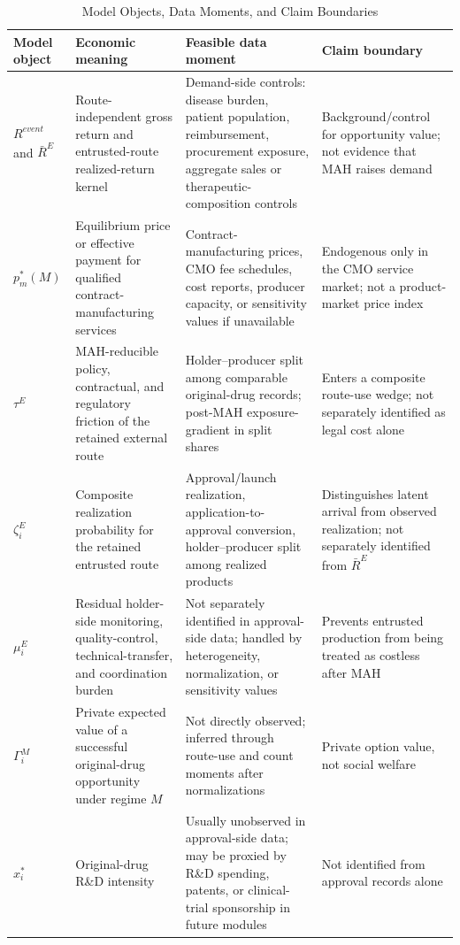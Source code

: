 \documentclass[12pt]{article}
\newcommand{\1}{\mathbf{1}}
\begin{document}
\begin{table}[htbp]
\centering
\scriptsize
\caption{Model Objects, Data Moments, and Claim Boundaries}
\label{tab:model_data_mapping}
\begin{tabularx}{\textwidth}{@{}L{0.17\textwidth}L{0.25\textwidth}L{0.24\textwidth}Y@{}}
\toprule
Model object & Economic meaning & Feasible data moment & Claim boundary \\
\midrule
$R^{event}$ and $\bar R^E$ & Route-independent gross return and entrusted-route realized-return kernel & Demand-side controls: disease burden, patient population, reimbursement, procurement exposure, aggregate sales or therapeutic-composition controls & Background/control for opportunity value; not evidence that MAH raises demand \\
$p_m^*(M)$ & Equilibrium price or effective payment for qualified contract-manufacturing services & Contract-manufacturing prices, CMO fee schedules, cost reports, producer capacity, or sensitivity values if unavailable & Endogenous only in the CMO service market; not a product-market price index \\
$\tau^E$ & MAH-reducible policy, contractual, and regulatory friction of the retained external route & Holder--producer split among comparable original-drug records; post-MAH exposure-gradient in split shares & Enters a composite route-use wedge; not separately identified as legal cost alone \\
$\zeta_i^E$ & Composite realization probability for the retained entrusted route & Approval/launch realization, application-to-approval conversion, holder--producer split among realized products & Distinguishes latent arrival from observed realization; not separately identified from $\bar R^E$ \\
$\mu_i^E$ & Residual holder-side monitoring, quality-control, technical-transfer, and coordination burden & Not separately identified in approval-side data; handled by heterogeneity, normalization, or sensitivity values & Prevents entrusted production from being treated as costless after MAH \\
$\Gamma_i^M$ & Private expected value of a successful original-drug opportunity under regime $M$ & Not directly observed; inferred through route-use and count moments after normalizations & Private option value, not social welfare \\
$x_i^*$ & Original-drug R\&D intensity & Usually unobserved in approval-side data; may be proxied by R\&D spending, patents, or clinical-trial sponsorship in future modules & Not identified from approval records alone \\

\end{tabularx}
\end{table}
\end{document}

